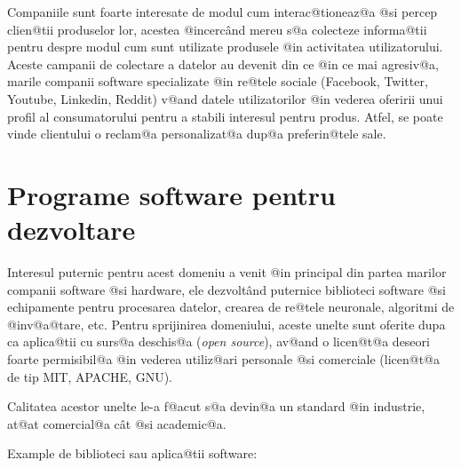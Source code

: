 	Companiile sunt foarte interesate de modul cum interac@tioneaz@a @si percep clien@tii produselor lor, acestea @incerc\^ and mereu s@a colecteze informa@tii pentru despre modul cum sunt utilizate produsele @in activitatea utilizatorului. Aceste campanii de colectare a datelor au devenit din ce @in ce mai agresiv@a, marile companii software specializate @in re@tele sociale (Facebook, Twitter, Youtube, Linkedin, Reddit) v@and datele utilizatorilor @in vederea oferirii unui profil al consumatorului pentru a stabili interesul pentru produs. Atfel, se poate vinde clientului o reclam@a personalizat@a dup@a preferin@tele sale. 
	 
\section{Programe software pentru dezvoltare}

Interesul puternic pentru acest domeniu a venit @in principal din partea marilor companii software @si hardware, ele dezvolt\^ and puternice biblioteci software @si echipamente pentru procesarea datelor, crearea de re@tele neuronale, algoritmi de @inv@a@tare, etc. Pentru sprijinirea domeniului, aceste unelte sunt oferite dupa ca aplica@tii cu surs@a deschis@a ({\sl open source}), av@and o licen@t@a deseori foarte permisibil@a @in vederea utiliz@ari personale @si comerciale (licen@t@a de tip MIT, APACHE, GNU).

Calitatea acestor unelte le-a f@acut s@a devin@a un standard @in industrie, at@at comercial@a c\^ at @si academic@a.

Example de biblioteci sau aplica@tii software:

